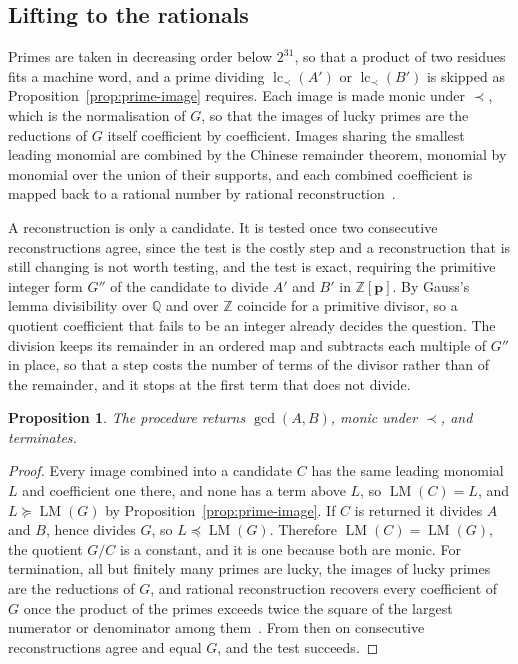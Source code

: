 \documentclass[11pt,a4paper]{article}
\theoremstyle{plain}
\newtheorem{proposition}{Proposition}
\theoremstyle{definition}
\theoremstyle{remark}
\newcommand{\QQ}{\mathbb{Q}}
\newcommand{\bp}{\boldsymbol{p}}
\newcommand{\LM}{\operatorname{LM}}
\begin{document}
\subsection{Lifting to the rationals}

Primes are taken in decreasing order below $2^{31}$, so that a product of two residues fits a machine
word, and a prime dividing $\operatorname{lc}_\prec(A')$ or $\operatorname{lc}_\prec(B')$ is skipped as
Proposition~\ref{prop:prime-image} requires. Each image is made monic under $\prec$, which is the
normalisation of $G$, so that the images of lucky primes are the reductions of $G$ itself coefficient by
coefficient. Images sharing the smallest leading monomial are combined by the Chinese remainder theorem,
monomial by monomial over the union of their supports, and each combined coefficient is mapped back to a
rational number by rational reconstruction~\cite{wang1982,vzgg2013}.

A reconstruction is only a candidate. It is tested once two consecutive reconstructions agree, since the
test is the costly step and a reconstruction that is still changing is not worth testing, and the test
is exact, requiring the primitive integer form $G''$ of the candidate to divide $A'$ and $B'$ in
$\mathbb{Z}[\bp]$. By Gauss's lemma divisibility over $\QQ$ and over $\mathbb{Z}$ coincide for a
primitive divisor, so a quotient coefficient that fails to be an integer already decides the question.
The division keeps its remainder in an ordered map and subtracts each multiple of $G''$ in place, so
that a step costs the number of terms of the divisor rather than of the remainder, and it stops at the
first term that does not divide.

\begin{proposition}
\label{prop:correct}
The procedure returns $\gcd(A,B)$, monic under $\prec$, and terminates.
\end{proposition}

\begin{proof}
Every image combined into a candidate $C$ has the same leading monomial $L$ and coefficient one there,
and none has a term above $L$, so $\LM(C) = L$, and $L \succeq \LM(G)$ by
Proposition~\ref{prop:prime-image}. If $C$ is returned it divides $A$ and $B$, hence divides $G$, so
$L \preceq \LM(G)$. Therefore $\LM(C) = \LM(G)$, the quotient $G/C$ is a constant, and it is one because
both are monic. For termination, all but finitely many primes
are lucky, the images of lucky primes are the reductions of $G$, and rational reconstruction recovers
every coefficient of $G$ once the product of the primes exceeds twice the square of the largest
numerator or denominator among them~\cite[Sec.~5.10]{vzgg2013}. From then on consecutive
reconstructions agree and equal $G$, and the test succeeds.
\end{proof}
\end{document}
